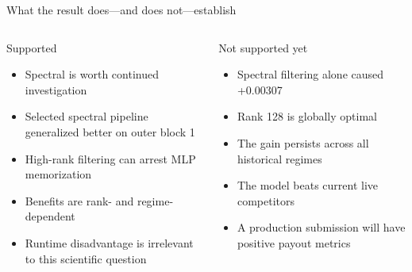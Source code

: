\documentclass[aspectratio=169,10pt]{beamer}
\begin{document}
\begin{frame}{What the result does—and does not—establish}
  \begin{columns}[T]
    \begin{block}{Supported}
      \begin{itemize}
        \item Spectral is worth continued investigation
        \item Selected spectral pipeline generalized better on outer block 1
        \item High-rank filtering can arrest MLP memorization
        \item Benefits are rank- and regime-dependent
        \item Runtime disadvantage is irrelevant to this scientific question
      \end{itemize}
    \end{block}
    \begin{block}{Not supported yet}
      \begin{itemize}
        \item Spectral filtering alone caused +0.00307
        \item Rank 128 is globally optimal
        \item The gain persists across all historical regimes
        \item The model beats current live competitors
        \item A production submission will have positive payout metrics
      \end{itemize}
    \end{block}
  \end{columns}
\end{frame}
\end{document}
